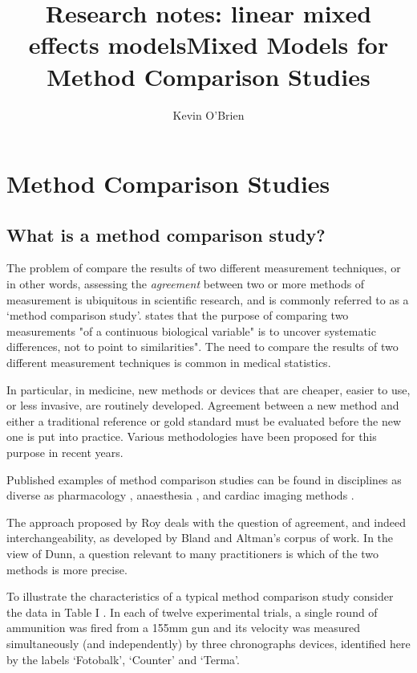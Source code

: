 \documentclass[12pt, a4paper]{report}
\title{Research notes: linear mixed effects models}
\author{ } \date{ }
\theoremstyle{plain}
\theoremstyle{definition}
\theoremstyle{remark}
\begin{document}
	\author{Kevin O'Brien}
	\title{Mixed Models for Method Comparison Studies}
	\tableofcontents
	
	\newpage
	\chapter{Method Comparison Studies}

		
\section{What is a method comparison study?}
	
	
	The problem of compare the results of two different measurement
	techniques, or in other words, assessing the \textit{agreement} between two or more methods
	of measurement is ubiquitous in scientific research, and is
	commonly referred to as a `method comparison study'. \citet{ludbrook97} states that the purpose of comparing two measurements "of a continuous biological variable" is to uncover systematic differences, not to point to similarities". The need to compare the results of two different measurement techniques is common in medical statistics. 
	
		In particular, in medicine, new methods or devices that are cheaper, easier to use, or less invasive, are routinely developed. Agreement between a new method and either a traditional reference or gold standard must be evaluated before the new one is put into practice. Various methodologies have been proposed for this purpose in recent years.
		
	Published examples of method comparison studies can be found in disciplines	as diverse as pharmacology \citep{ludbrook97}, anaesthesia	\citep{Myles}, and cardiac imaging methods \citep{Krumm}.
	
	The approach proposed by Roy deals with the question of agreement, and indeed interchangeability, as developed by Bland and Altman's corpus of work.  In the view of Dunn, a question relevant to many practitioners is which of the two methods is more precise.
	
	
	To illustrate the characteristics of a typical method comparison
	study consider the data in Table I \citep{Grubbs73}. In each of
	twelve experimental trials, a single round of ammunition was fired
	from a 155mm gun and its velocity was measured simultaneously (and
	independently) by three chronographs devices, identified here by
	the labels `Fotobalk', `Counter' and `Terma'.
	\smallskip
		
\end{document}
